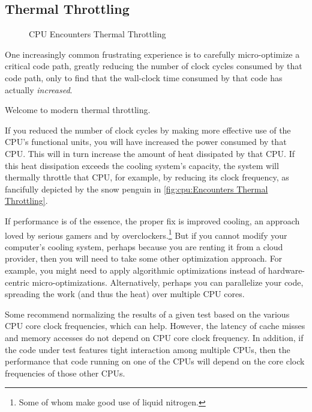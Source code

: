 \subsection{Thermal Throttling}
\label{sec:cpu:Thermal Throttling}

\begin{figure}
\centering
{}
\caption{CPU Encounters Thermal Throttling}
\end{figure}

One increasingly common frustrating experience is to carefully
micro-optimize a critical code path, greatly reducing the number of
clock cycles consumed by that code path, only to find that the
wall-clock time consumed by that code has actually \emph{increased}.

Welcome to modern thermal throttling.

If you reduced the number of clock cycles by making more effective
use of the CPU's functional units, you will have increased the
power consumed by that CPU\@.
This will in turn increase the amount of heat dissipated by that CPU\@.
If this heat dissipation exceeds the cooling system's capacity, the
system will thermally throttle that CPU, for example, by reducing
its clock frequency, as fancifully depicted by the snow penguin in
\cref{fig:cpu:Encounters Thermal Throttling}.

If performance is of the essence, the proper fix is improved cooling,
an approach loved by serious gamers and by overclockers.\footnote{
	Some of whom make good use of liquid nitrogen.}
But if you cannot modify your computer's cooling system, perhaps because
you are renting it from a cloud provider, then you will need to take
some other optimization approach.
For example, you might need to apply algorithmic optimizations instead
of hardware-centric micro-optimizations.
Alternatively, perhaps you can parallelize your code, spreading the
work (and thus the heat) over multiple CPU cores.

Some recommend normalizing the results of a given test based on
the various CPU core clock frequencies, which can help.
However, the latency of cache misses and memory accesses do not
depend on CPU core clock frequency.
In addition, if the code under test features tight interaction among
multiple CPUs, then the performance that code running on one of the CPUs
will depend on the core clock frequencies of those other CPUs.

